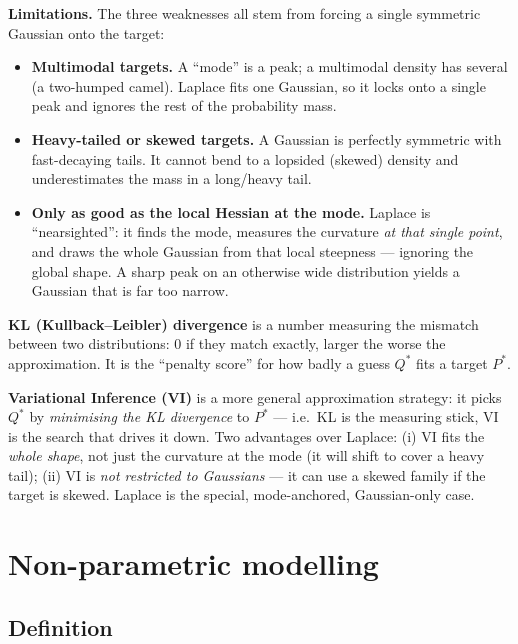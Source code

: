 \documentclass[11pt, a4paper]{article}
\begin{document}
\textbf{Limitations.} The three weaknesses all stem from forcing a single symmetric Gaussian onto the target:
\begin{itemize}
  \item \textbf{Multimodal targets.} A ``mode'' is a peak; a multimodal density has several (a two-humped camel). Laplace fits one Gaussian, so it locks onto a single peak and ignores the rest of the probability mass.
  \item \textbf{Heavy-tailed or skewed targets.} A Gaussian is perfectly symmetric with fast-decaying tails. It cannot bend to a lopsided (skewed) density and underestimates the mass in a long/heavy tail.
  \item \textbf{Only as good as the local Hessian at the mode.} Laplace is ``nearsighted'': it finds the mode, measures the curvature \emph{at that single point}, and draws the whole Gaussian from that local steepness — ignoring the global shape. A sharp peak on an otherwise wide distribution yields a Gaussian that is far too narrow.
\end{itemize}

\begin{notebox}
\textbf{KL (Kullback--Leibler) divergence} is a number measuring the mismatch between two distributions: $0$ if they match exactly, larger the worse the approximation. It is the ``penalty score'' for how badly a guess $Q^*$ fits a target $P^*$.

\textbf{Variational Inference (VI)} is a more general approximation strategy: it picks $Q^*$ by \emph{minimising the KL divergence} to $P^*$ — i.e.\ KL is the measuring stick, VI is the search that drives it down. Two advantages over Laplace: (i) VI fits the \emph{whole shape}, not just the curvature at the mode (it will shift to cover a heavy tail); (ii) VI is \emph{not restricted to Gaussians} — it can use a skewed family if the target is skewed. Laplace is the special, mode-anchored, Gaussian-only case.
\end{notebox}

\section{Non-parametric modelling}

\subsection{Definition}
\end{document}
